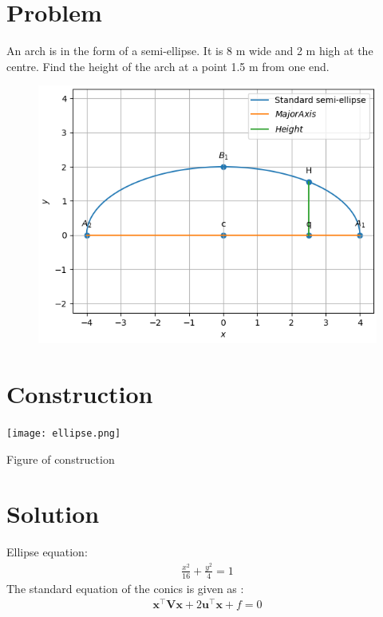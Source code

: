 \documentclass[10pt, a4paper]{article}
\title{\mytitle}
\author{\myauthor\hspace{1em}\\\contact\\FWC22011\hspace{6.5em}IITH\hspace{0.5em}\mymodule\hspace{6em}Matrix:conic}
\date{}
\let\vec\mathbf
\begin{document}
	\maketitle
	\tableofcontents
   \section{Problem}
   \fi
An arch is in the form of a semi-ellipse. It is 8 m wide and 2 m high at the centre. Find the height of the arch at a point 1.5 m from one end.
\\
\solution 
	\begin{figure}[!ht]
		\centering
 \includegraphics[width=\columnwidth]{chapters/11/11/5/4/figs/ellipse.png}
		\caption{}
		\label{fig:11/11/5/4}
  	\end{figure}
	\iffalse

\section{Construction}
  \texttt{[image: ellipse.png]}
  	\begin{center}
  Figure of construction
  	\end{center}
  \section{Solution}
Ellipse equation:
\begin{align}
\frac{x^2}{16}+\frac{y^2}{4}=1
\end{align}
The standard equation of the conics is given as :
\begin{align}
\vec{x}^{\top}\vec{V}\vec{x}+2\vec{u}^{\top}\vec{x}+f=0
\label{eq:conic}
\end{align}
\end{document}

